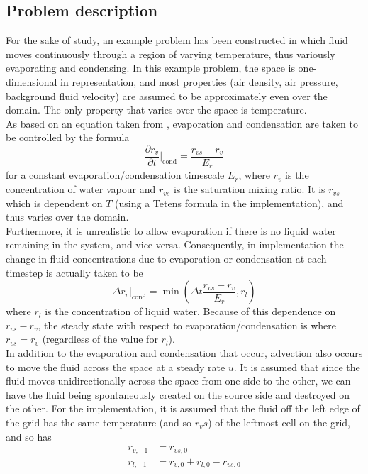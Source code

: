 \documentclass[11pt]{article}
\begin{document}
\subsection{Problem description}
For the sake of study, an example problem has been constructed in which fluid moves continuously through a region of varying temperature, thus variously evaporating and condensing. In this example problem, the space is one-dimensional in representation, and most properties (air density, air pressure, background fluid velocity) are assumed to be approximately even over the domain. The only property that varies over the space is temperature. \\
As based on an equation taken from \citet{BF2002}, evaporation and condensation are taken to be controlled by the formula
\begin{equation} \label{eq:1}
\frac{\partial r_v}{\partial t}|_{\text{cond}}=\frac{r_{vs} - r_v}{E_r}
\end{equation}
for a constant evaporation/condensation timescale $E_r$, where $r_v$ is the concentration of water vapour and $r_{vs}$ is the saturation mixing ratio. It is $r_{vs}$ which is dependent on $T$ (using a Tetens formula in the implementation), and thus varies over the domain. \\
Furthermore, it is unrealistic to allow evaporation if there is no liquid water remaining in the system, and vice versa. Consequently, in implementation the change in fluid concentrations due to evaporation or condensation at each timestep is actually taken to be
\begin{equation} \label{eq:2}
\Delta r_v|_{\text{cond}} = \min\left(\Delta t\frac{r_{vs} - r_v}{E_r},r_l\right)
\end{equation}
where $r_l$ is the concentration of liquid water. Because of this dependence on $r_{vs}-r_v$, the steady state with respect to evaporation/condensation is where $r_{vs}=r_v$ (regardless of the value for $r_l$). \\
In addition to the evaporation and condensation that occur, advection also occurs to move the fluid across the space at a steady rate $u$. It is assumed that since the fluid moves unidirectionally across the space from one side to the other, we can have the fluid being spontaneously created on the source side and destroyed on the other. For the implementation, it is assumed that the fluid off the left edge of the grid has the same temperature (and so $r_vs$) of the leftmost cell on the grid, and so has
\begin{align}
r_{v,-1} &= r_{vs,0} \label{eq:a} \\
r_{l,-1} &= r_{v,0}+r_{l,0}-r_{vs,0} \label{eq:b}
\end{align}
\end{document}
